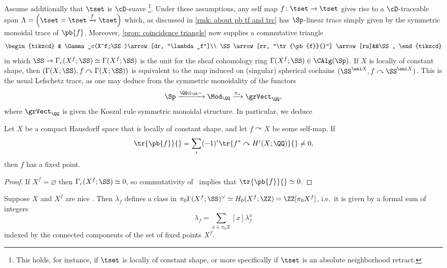   Assume additionally that $\tset$ is $\cD$-suave \footnote{This holds, for instance, if $\tset$ is locally of constant shape, or more specifically if $\tset$ is an absolute neighborhood retract.}. 
  Under these assumptions, any self map $f\colon \tset \to \tset$
  gives rise to a $\cD$-traceable span 
  $\Lambda =\left(\tset= \tset \xrightarrow{f}\tset \right)$ which, as discussed
  in \cref{rmk: about pb tf and trc} has $\Sp$-linear trace simply 
  given by the symmetric monoidal trace of $\pb{f}$. 
  Moreover, \cref{prop: coincidence triangle} now supplies a commutative triangle
  \begin{equation}
    \label{eq:topological-lefschetz-trace}
    \begin{tikzcd}
      & \Gamma_c(X^f;\SS )\arrow[dr, "\lambda_f"]\\
      \SS\arrow[rr, "\tr{\pb{f}}{}"] \arrow[ru]&&\SS,
    \end{tikzcd}
  \end{equation}
  in which $\SS\to\Gamma_c(X^f;\SS )\simeq\Gamma (X^f;\SS )$ is the unit for the sheaf cohomology ring $\Gamma (X^f;\SS )\in\CAlg (\Sp)$. If $X$ is locally of constant shape, then $(\Gamma (X;\SS ),f\curvearrowright \Gamma (X;\SS ))$ is equivalent to the map induced on (singular) spherical cochains $(\SS^{\ani X},f\curvearrowright \SS^{\ani X})$. This is the usual Lefschetz trace, as one may deduce from the symmetric monoidality of the functors
  \[
    \Sp\xrightarrow{\QQ\otimes_{\SS}{-}}
    \Mod_{\QQ}\xrightarrow{\pi_*}
    \grVect_\QQ,
  \]
  where $\grVect_\QQ$ is given the Koszul rule symmetric monoidal structure. In particular, we deduce
  \begin{cor}
    Let $X$ be a compact Hausdorff space that is locally of constant shape, and let $f\curvearrowright X$ be some self-map. If
    \[
      \tr{\pb{f}}{} = \sum_i (-1)^i\tr{f^*\curvearrowright H^i(X;\QQ )}{}\neq 0,
    \]
    then $f$ has a fixed point.
  \end{cor}
  \begin{proof}
    If $X^f = \varnothing$ then $\Gamma_c(X^f;\SS )\simeq 0$, so commutativity of~ implies that $\tr{\pb{f}}{}\simeq 0$.
  \end{proof}

\begin{rmk}
    Suppose $X$ and $X^f$ are nice . 
    Then $\lambda_f$ defines
    a class in $\pi_0\Gamma(X^f;\SS)^{\vee} \simeq H_0(X^f;\ZZ)=\ZZ[\pi_0X^f]$, i.e.~it is given by a formal sum of integers
    \[ \lambda_f= \sum_{x\in \pi_0X}[x]\lambda_f^{x}\]
    indexed by the connected components of the set of fixed points $X^f$. 
\end{rmk}
  

